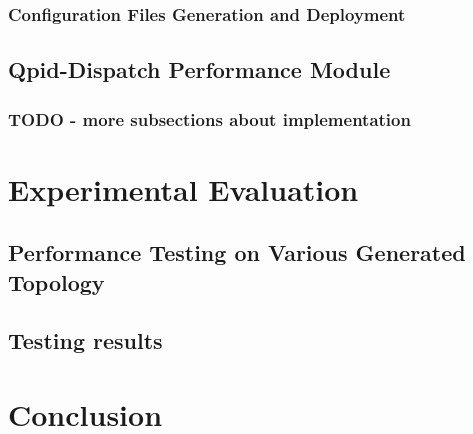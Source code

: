 \subsection{Configuration Files Generation and Deployment}

\section{Qpid-Dispatch Performance Module}

\subsection{TODO - more subsections about implementation}

\chapter{Experimental Evaluation}
\label{Experimental Evaluation}

\section{Performance Testing on Various Generated Topology}

\section{Testing results}

\chapter{Conclusion}
\label{Conclusion}
